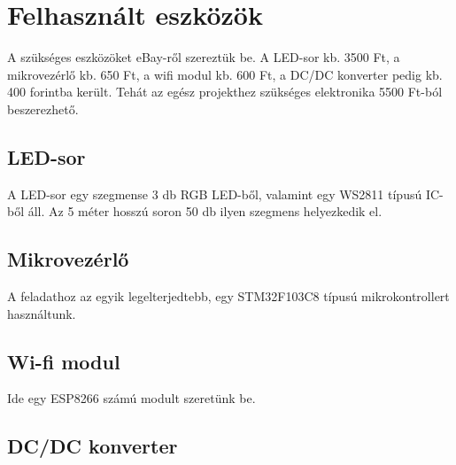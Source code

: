 \documentclass[12pt]{extarticle}
\begin{document}
	\section{Felhasznált eszközök}
	
	A szükséges eszközöket eBay-ről szereztük be. A LED-sor kb. 3500 Ft, a mikrovezérlő kb. 650 Ft, a wifi modul kb. 600 Ft, a DC/DC konverter pedig kb. 400 forintba került. Tehát az egész projekthez szükséges elektronika 5500 Ft-ból beszerezhető.
	
	\subsection{LED-sor}
	
	A LED-sor egy szegmense 3 db RGB LED-ből, valamint egy  WS2811 típusú IC-ből áll. Az 5 méter hosszú soron 50 db ilyen szegmens helyezkedik el.  
	
	\subsection{Mikrovezérlő}
	
	A feladathoz az egyik legelterjedtebb, egy STM32F103C8 típusú mikrokontrollert használtunk. 
	
	\subsection{Wi-fi modul}
	
	Ide egy ESP8266 számú modult szeretünk be.
	
	\subsection{DC/DC konverter}
	
	
	
	
	
	
	
	
	
	
	
	
	
	
	
	
	
\end{document}
